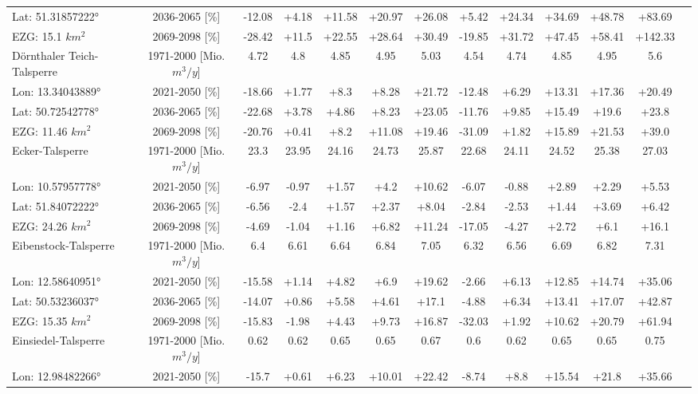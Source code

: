 \begin{longtable}{@{\extracolsep{\fill}}lc|ccccc||cccccc}
Lat: 51.31857222° & 2036-2065 [\%]  & -12.08 & +4.18 & +11.58 & +20.97 & +26.08 & +5.42 & +24.34 & +34.69 & +48.78 & +83.69 & \\ 
EZG: 15.1 $km^2$ & 2069-2098 [\%]  & -28.42 & +11.5 & +22.55 & +28.64 & +30.49 & -19.85 & +31.72 & +47.45 & +58.41 & +142.33 & \\ 
\hline 
Dörnthaler Teich-Talsperre & 1971-2000 [Mio. $m^3/y$]  & 4.72 & 4.8 & 4.85 & 4.95 & 5.03 & 4.54 & 4.74 & 4.85 & 4.95 & 5.6 & \\ 
\cline{2-13} 
Lon: 13.34043889° & 2021-2050 [\%]  & -18.66 & +1.77 & +8.3 & +8.28 & +21.72 & -12.48 & +6.29 & +13.31 & +17.36 & +20.49 & \\ 
Lat: 50.72542778° & 2036-2065 [\%]  & -22.68 & +3.78 & +4.86 & +8.23 & +23.05 & -11.76 & +9.85 & +15.49 & +19.6 & +23.8 & \\ 
EZG: 11.46 $km^2$ & 2069-2098 [\%]  & -20.76 & +0.41 & +8.2 & +11.08 & +19.46 & -31.09 & +1.82 & +15.89 & +21.53 & +39.0 & \\ 
\hline 
Ecker-Talsperre & 1971-2000 [Mio. $m^3/y$]  & 23.3 & 23.95 & 24.16 & 24.73 & 25.87 & 22.68 & 24.11 & 24.52 & 25.38 & 27.03 & \\ 
\cline{2-13} 
Lon: 10.57957778° & 2021-2050 [\%]  & -6.97 & -0.97 & +1.57 & +4.2 & +10.62 & -6.07 & -0.88 & +2.89 & +2.29 & +5.53 & \\ 
Lat: 51.84072222° & 2036-2065 [\%]  & -6.56 & -2.4 & +1.57 & +2.37 & +8.04 & -2.84 & -2.53 & +1.44 & +3.69 & +6.42 & \\ 
EZG: 24.26 $km^2$ & 2069-2098 [\%]  & -4.69 & -1.04 & +1.16 & +6.82 & +11.24 & -17.05 & -4.27 & +2.72 & +6.1 & +16.1 & \\ 
\hline 
Eibenstock-Talsperre & 1971-2000 [Mio. $m^3/y$]  & 6.4 & 6.61 & 6.64 & 6.84 & 7.05 & 6.32 & 6.56 & 6.69 & 6.82 & 7.31 & \\ 
\cline{2-13} 
Lon: 12.58640951° & 2021-2050 [\%]  & -15.58 & +1.14 & +4.82 & +6.9 & +19.62 & -2.66 & +6.13 & +12.85 & +14.74 & +35.06 & \\ 
Lat: 50.53236037° & 2036-2065 [\%]  & -14.07 & +0.86 & +5.58 & +4.61 & +17.1 & -4.88 & +6.34 & +13.41 & +17.07 & +42.87 & \\ 
EZG: 15.35 $km^2$ & 2069-2098 [\%]  & -15.83 & -1.98 & +4.43 & +9.73 & +16.87 & -32.03 & +1.92 & +10.62 & +20.79 & +61.94 & \\ 
\hline 
Einsiedel-Talsperre & 1971-2000 [Mio. $m^3/y$]  & 0.62 & 0.62 & 0.65 & 0.65 & 0.67 & 0.6 & 0.62 & 0.65 & 0.65 & 0.75 & \\ 
\cline{2-13} 
Lon: 12.98482266° & 2021-2050 [\%]  & -15.7 & +0.61 & +6.23 & +10.01 & +22.42 & -8.74 & +8.8 & +15.54 & +21.8 & +35.66 & \\ 

\end{longtable}
